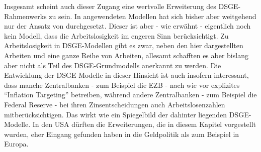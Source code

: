 Insgesamt scheint auch dieser Zugang eine wertvolle Erweiterung des DSGE-Rahmenwerks zu sein. In angewendeten Modellen hat sich bisher aber weitgehend nur der Ansatz von \textcite{Erceg2000} durchgesetzt. Dieser ist aber - wie erwähnt - eigentlich noch kein Modell, dass die Arbeitslosigkeit im engeren Sinn berücksichtigt. Zu Arbeitslosigkeit in DSGE-Modellen gibt es zwar, neben den hier dargestellten Arbeiten \textcite{Gali2011a, Gali2011b} und \textcite{Blanchard2010} eine ganze Reihe von Arbeiten, allesamt schafften es aber bislang aber nicht als Teil des DSGE-Grundmodells anerkannt zu werden. Die Entwicklung der DSGE-Modelle in dieser Hinsicht ist auch insofern interessant, dass manche Zentralbanken - zum Beispiel die EZB - nach wie vor explizites "`Inflation Targeting"' betreiben, während andere Zentralbanken - zum Beispiel die Federal Reserve - bei ihren Zinsentscheidungen auch Arbeitslosenzahlen mitberücksichtigen. Das wirkt wie ein Spiegelbild der dahinter liegenden DSGE-Modelle. In den USA dürften die Erweiterungen, die in diesem Kapitel vorgestellt wurden, eher Eingang gefunden haben in die Geldpolitik als zum Beispiel in Europa.

